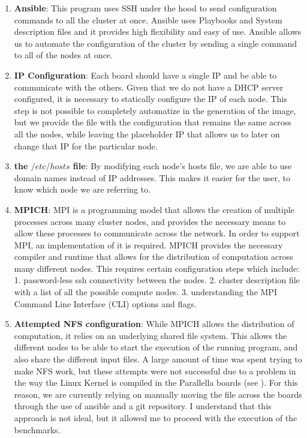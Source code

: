 \documentclass[letterpaper,12pt]{article}
\begin{document}
  \begin{enumerate}
  \item \textbf{Ansible}: This program uses SSH under the hood to send configuration commands to all the cluster at once. Ansible uses Playbooks and System description files and it provides high flexibility and easy of use. Ansible allows us to automate the configuration of the cluster by sending a single command to all of the nodes at once.
  \item \textbf{IP Configuration}:  Each board should have a single IP and be able to communicate with the others. Given that we do not have a DHCP server configured, it is necessary to statically configure the IP of each node. This step is not possible to completely automatize in the generation of the image, but we provide the file with the configuration that remains the same across all the nodes, while leaving the placeholder IP that allows us to later on change that IP for the particular node.
  \item \textbf{the $/etc/hosts$ file}: By modifying each node's hosts file, we are able to use domain names instead of IP addresses. This makes it easier for the user, to know which node we are referring to.
  \item \textbf{MPICH}: MPI is a programming model that allows the creation of multiple processes across many cluster nodes, and provides the necessary means to allow these processes to communicate across the network. In order to support MPI, an implementation of it is required. MPICH provides the necessary compiler and runtime that allows for the distribution of computation across many different nodes. This requires certain configuration steps which include: 1. password-less ssh connectivity between the nodes. 2. cluster description file with a list of all the possible compute nodes. 3. understanding the MPI Command Line Interface (CLI) options and flags.
  \item \textbf{Attempted NFS configuration}: While MPICH allows the distribution of computation, it relies on an underlying shared file system. This allows the different nodes to be able to start the execution of the running program, and also share the different input files. A large amount of time was spent trying to make NFS work, but these attempts were not successful due to a problem in the way the Linux Kernel is compiled in the Parallella boards (see \cite{parallellaNFSProblem}). For this reason, we are currently relying on manually moving the file across the boards through the use of ansible and a git repository. I understand that this approach is not ideal, but it allowed me to proceed with the execution of the benchmarks.

  \end{enumerate}
\end{document}
